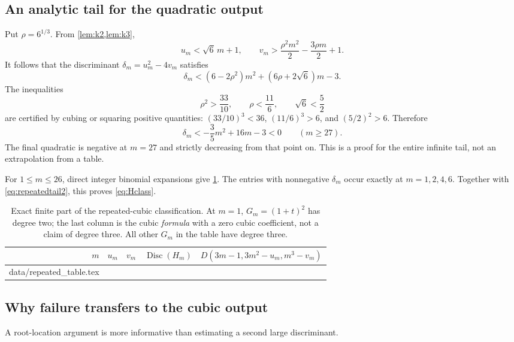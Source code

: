 \documentclass[11pt,letterpaper]{article}
\makeatletter
\let\tableinput\@@input
\numberwithin{equation}{section}
\theoremstyle{definition}
\theoremstyle{remark}
\newcommand{\Disc}{\operatorname{Disc}}
\makeatother
\begin{document}
\subsection{An analytic tail for the quadratic output}

Put $\rho=6^{1/3}$. From \cref{lem:k2,lem:k3},
\[
 u_m<\sqrt6\,m+1,\qquad
 v_m>\frac{\rho^2m^2}{2}-\frac{3\rho m}{2}+1.
\]
It follows that the discriminant $\delta_m=u_m^2-4v_m$ satisfies
\begin{equation}\label{eq:repeatedtail1}
 \delta_m<(6-2\rho^2)m^2+(6\rho+2\sqrt6)m-3.
\end{equation}
The inequalities
\[
 \rho^2>\frac{33}{10},\qquad \rho<\frac{11}{6},\qquad
 \sqrt6<\frac52
\]
are certified by cubing or squaring positive quantities:
$(33/10)^3<36$, $(11/6)^3>6$, and $(5/2)^2>6$.
Therefore
\begin{equation}\label{eq:repeatedtail2}
 \delta_m<-\frac35m^2+16m-3<0\qquad(m\ge27).
\end{equation}
The final quadratic is negative at $m=27$ and strictly decreasing from that
point on. This is a proof for the entire infinite tail, not an extrapolation
from a table.

For $1\le m\le26$, direct integer binomial expansions give
\cref{tab:repeated}. The entries with nonnegative $\delta_m$ occur exactly
at $m=1,2,4,6$. Together with \eqref{eq:repeatedtail2}, this proves
\eqref{eq:Hclass}.

\begin{table}[p]
\centering
\small
\begin{tabular}{@{}rrrrr@{}}
\toprule
$m$ & $u_m$ & $v_m$ & $\Disc(H_m)$ & $D(3m-1,3m^2-u_m,m^3-v_m)$\\
\midrule
\tableinput data/repeated_table.tex
\bottomrule
\end{tabular}
\caption{Exact finite part of the repeated-cubic classification.
At $m=1$, $G_m=(1+t)^2$ has degree two; the last column is the cubic
\emph{formula} with a zero cubic coefficient, not a claim of degree three.
All other $G_m$ in the table have degree three.}
\label{tab:repeated}
\end{table}

\subsection{Why failure transfers to the cubic output}

A root-location argument is more informative than estimating a second
large discriminant.
\end{document}
